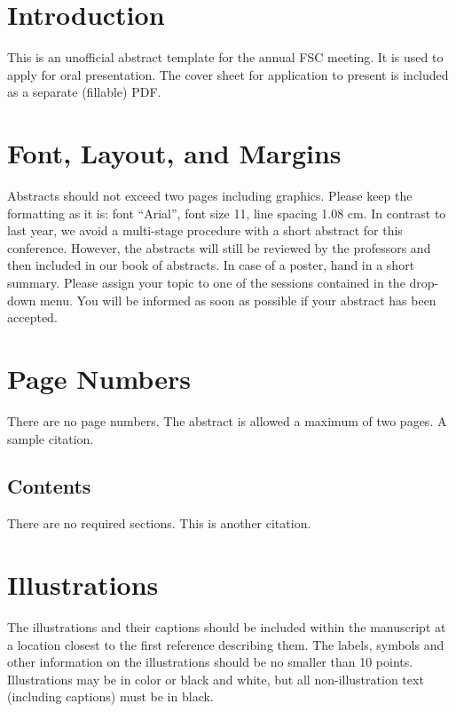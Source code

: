 \documentclass[11pt,a4paper]{fsc} %
\begin{document}
\begin{multicols}{2} %
\section*{Introduction}
This is an unofficial abstract template for the annual FSC meeting.
It is used to apply for oral presentation.
The cover sheet for application to present is included as a separate (fillable) PDF.

\section*{Font, Layout, and Margins}
Abstracts should not exceed two pages including graphics.
Please keep the formatting as it is: font ``Arial'', font size 11, line spacing 1.08 cm.
In contrast to last year, we avoid a multi-stage procedure with a short abstract for this conference.
However, the abstracts will still be reviewed by the professors and then included in our book of abstracts.
In case of a poster, hand in a short summary.
Please assign your topic to one of the sessions contained in the drop-down menu.
You will be informed as soon as possible if your abstract has been accepted.

\section*{Page Numbers}
There are no page numbers.
The abstract is allowed a maximum of two pages.
A sample citation\cite{Affleck1967}.


\subsection*{Contents}
There are no required sections.
This is another citation\cite{Haworth2011}.

\section*{Illustrations}
The illustrations and their captions should be included within the manuscript at a location closest to the first reference describing them.
The labels, symbols and other information on the illustrations should be no smaller than 10 points.
Illustrations may be in color or black and white, but all non-illustration text (including captions) must be in black.


\end{multicols}
\end{document}
